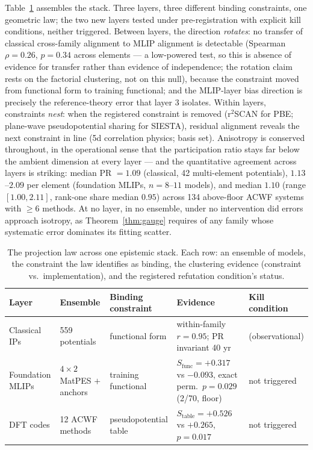 \documentclass[11pt]{article}
\theoremstyle{remark}
\begin{document}
Table~\ref{tab:layers} assembles the stack. Three layers, three different
binding constraints, one geometric law; the two new layers tested under
pre-registration with explicit kill conditions, neither triggered. Between
layers, the direction \emph{rotates}: no transfer of classical cross-family
alignment to MLIP alignment is detectable (Spearman $\rho = 0.26$, $p = 0.34$
across elements --- a low-powered test, so this is absence of evidence for
transfer rather than evidence of independence; the rotation claim rests on
the factorial clustering, not on this null), because the constraint moved
from functional form to training functional; and the MLIP-layer bias
direction is precisely the reference-theory error that layer 3 isolates.
Within layers, constraints \emph{nest}: when the registered constraint is
removed (r$^2$SCAN for PBE; plane-wave pseudopotential sharing for SIESTA),
residual alignment reveals the next constraint in line (5d correlation
physics; basis set). Anisotropy is conserved throughout, in the operational
sense that the participation ratio stays far below the ambient dimension at
every layer --- and the quantitative agreement across layers is striking:
median PR $= 1.09$ (classical, 42 multi-element potentials), $1.13$--$2.09$
per element (foundation MLIPs, $n = 8$--$11$ models), and median $1.10$
(range $[1.00, 2.11]$, rank-one share median $0.95$) across 134 above-floor
ACWF systems with $\geq 6$ methods. At no layer, in no ensemble, under no
intervention did errors approach isotropy, as Theorem~\ref{thm:gauge}
requires of any family whose systematic error dominates its fitting scatter.

\begin{table}[t]
\centering
\caption{The projection law across one epistemic stack. Each row: an ensemble
of models, the constraint the law identifies as binding, the clustering
evidence (constraint vs.\ implementation), and the registered refutation
condition's status.}
\label{tab:layers}
\small
\begin{tabularx}{\textwidth}{@{}lll>{\raggedright\arraybackslash}Xl@{}}
\toprule
Layer & Ensemble & Binding constraint & Evidence & Kill condition \\
\midrule
Classical IPs & 559 potentials & functional form & within-family $r{=}0.95$; PR invariant 40 yr & (observational) \\
Foundation MLIPs & $4{\times}2$ MatPES $+$ anchors & training functional & $S_{\mathrm{func}}{=}{+}0.317$ vs ${-}0.093$, exact perm.\ $p{=}0.029$ (2/70, floor) & not triggered \\
DFT codes & 12 ACWF methods & pseudopotential table & $S_{\mathrm{table}}{=}{+}0.526$ vs ${+}0.265$, $p{=}0.017$ & not triggered \\
\bottomrule
\end{tabularx}
\end{table}
\end{document}
